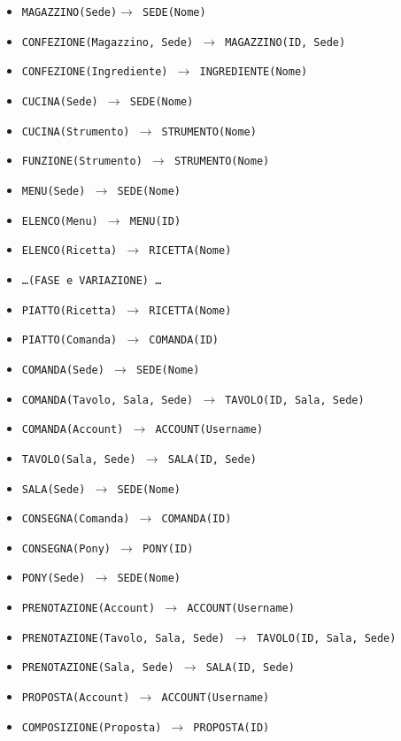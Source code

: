 \begin{itemize}[parsep=0pt,listparindent=9\parindent]
    \item\tt MAGAZZINO(Sede)$\rightarrow$ SEDE(Nome)
    \item\tt CONFEZIONE(Magazzino, Sede) $\rightarrow$ MAGAZZINO(ID, Sede)
    \item\tt CONFEZIONE(Ingrediente) $\rightarrow$ INGREDIENTE(Nome)
    \item\tt CUCINA(Sede) $\rightarrow$ SEDE(Nome)
    \item\tt CUCINA(Strumento) $\rightarrow$ STRUMENTO(Nome)
    \item\tt FUNZIONE(Strumento) $\rightarrow$ STRUMENTO(Nome)
    \item\tt MENU(Sede) $\rightarrow$ SEDE(Nome)
    \item\tt ELENCO(Menu) $\rightarrow$ MENU(ID)
    \item\tt ELENCO(Ricetta) $\rightarrow$ RICETTA(Nome)
    \item\tt \ldots (FASE e VARIAZIONE) \ldots                                  %
    \item\tt PIATTO(Ricetta) $\rightarrow$ RICETTA(Nome)
    \item\tt PIATTO(Comanda) $\rightarrow$ COMANDA(ID)
    \item\tt COMANDA(Sede) $\rightarrow$ SEDE(Nome)
    \item\tt COMANDA(Tavolo, Sala, Sede) $\rightarrow$ TAVOLO(ID, Sala, Sede)
    \item\tt COMANDA(Account) $\rightarrow$ ACCOUNT(Username)
    \item\tt TAVOLO(Sala, Sede) $\rightarrow$ SALA(ID, Sede)
    \item\tt SALA(Sede) $\rightarrow$ SEDE(Nome)
    \item\tt CONSEGNA(Comanda) $\rightarrow$ COMANDA(ID)
    \item\tt CONSEGNA(Pony) $\rightarrow$ PONY(ID)
    \item\tt PONY(Sede) $\rightarrow$ SEDE(Nome)
    \item\tt PRENOTAZIONE(Account) $\rightarrow$ ACCOUNT(Username)
    \item\tt PRENOTAZIONE(Tavolo, Sala, Sede) $\rightarrow$ TAVOLO(ID, Sala, Sede)
    \item\tt PRENOTAZIONE(Sala, Sede) $\rightarrow$ SALA(ID, Sede)
    \item\tt PROPOSTA(Account) $\rightarrow$ ACCOUNT(Username)
    \item\tt COMPOSIZIONE(Proposta) $\rightarrow$ PROPOSTA(ID)

\end{itemize}

